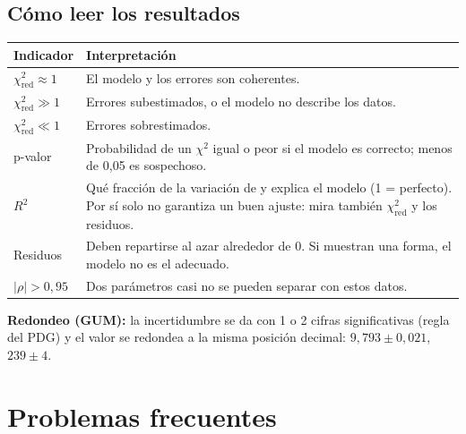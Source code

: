 \documentclass[11pt,a4paper]{article}
\newif\iffiserr
\begin{document}
\iffiserr\else
\subsection{Cómo leer los resultados}

\begin{tabularx}{\linewidth}{@{}lX@{}}\toprule
\textbf{Indicador} & \textbf{Interpretación}\\\midrule
$\chi^2_{\text{red}} \approx 1$ & El modelo y los errores son coherentes.\\
$\chi^2_{\text{red}} \gg 1$ & Errores subestimados, o el modelo no describe los datos.\\
$\chi^2_{\text{red}} \ll 1$ & Errores sobrestimados.\\
p-valor & Probabilidad de un $\chi^2$ igual o peor si el modelo es correcto; menos de 0,05 es sospechoso.\\
$R^2$ & Qué fracción de la variación de y explica el modelo (1 = perfecto). Por sí solo no garantiza un buen ajuste: mira también $\chi^2_{\text{red}}$ y los residuos.\\
Residuos & Deben repartirse al azar alrededor de 0. Si muestran una forma, el modelo no es el adecuado.\\
$|\rho| > 0{,}95$ & Dos parámetros casi no se pueden separar con estos datos.\\\bottomrule
\end{tabularx}
\fi

\textbf{Redondeo (GUM):} la incertidumbre se da con 1 o 2 cifras significativas (regla del PDG) y el valor se redondea a la misma posición decimal: $9{,}793 \pm 0{,}021$, $239 \pm 4$.

\section{Problemas frecuentes}
\end{document}
